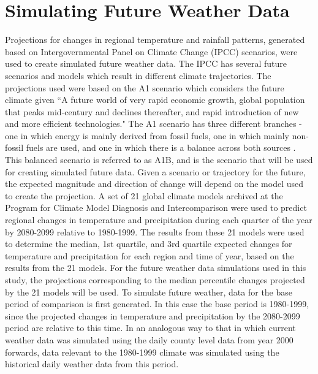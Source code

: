  

\section{Simulating Future Weather Data}


Projections for changes in regional temperature and rainfall patterns, generated based on Intergovernmental Panel on Climate Change (IPCC) scenarios, were used to create simulated future weather data. The IPCC has several future scenarios and models which result in different climate trajectories. The projections used were based on the A1 scenario which considers the future climate given ``A future world of very rapid economic growth, global population that peaks mid-century and declines thereafter, and rapid introduction of new and more efficient technologies." The A1 scenario has three different branches - one in which energy is mainly derived from fossil fuels, one in which mainly non-fossil fuels are used, and one in which there is a balance across both sources \citep{IPCCscenarios}. This balanced scenario is referred to as A1B, and is the scenario that will be used for creating simulated future data. Given a scenario or trajectory for the future, the expected magnitude and direction of change will depend on the model used to create the projection. A set of 21 global climate models archived at the Program for Climate Model Diagnosis and Intercomparison were used to predict regional changes in temperature and precipitation during each quarter of the year by 2080-2099 relative to 1980-1999. The results from these 21 models were used to determine the median, 1st quartile, and 3rd quartile expected changes for temperature and precipitation for each region and time of year, based on the results from the 21 models. For the future weather data simulations used in this study, the projections corresponding to the median percentile changes projected by the 21 models will be used. To simulate future weather, data for the base period of comparison is first generated. In this case the base period is 1980-1999, since the projected changes in temperature and precipitation by the 2080-2099 period are relative to this time. In an analogous way to that in which current weather data was simulated using the daily county level data from year 2000 forwards, data relevant to the 1980-1999 climate was simulated using the historical daily weather data from this period. 

